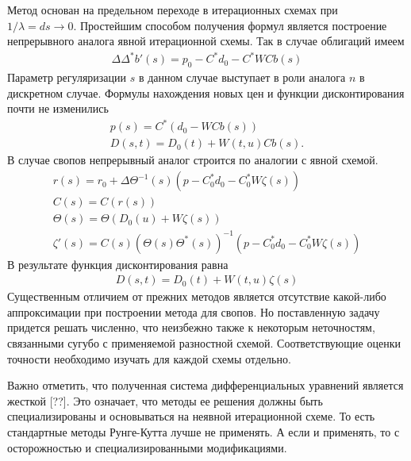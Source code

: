 \documentclass[10pt]{article}
\theoremstyle{definition}
\theoremstyle{remark}
\theoremstyle{plain}
\begin{document}
\begin{itemize}
Метод основан на предельном переходе в итерационных схемах при $1/\lambda = ds\rightarrow 0$. Простейшим способом получения формул является построение непрерывного аналога явной итерационной схемы.  Так в случае облигаций имеем
\begin{align*}
\Delta\Delta^*b'(s) = p_0-C^*d_0 - C^*WCb(s)
\end{align*}
Параметр регуляризации $s$ в данном случае выступает в роли аналога $n$ в дискретном случае. Формулы нахождения новых цен и функции дисконтирования почти не изменились 
\begin{gather*}
p(s) = C^*(d_0 - WCb(s))\\
D(s,t) = D_0(t) + W(t,u)C b(s).
\end{gather*}
В случае свопов непрерывный аналог строится по аналогии с явной схемой.
\begin{gather*}
r(s) = r_0 + \Delta\Theta^{-1}(s)\left(p - C_0^*d_0 - C_0^*W\zeta(s)\right) 
\\
C(s) = C(r(s))
\\
\Theta(s) = \Theta(D_0(u) + W\zeta(s))
\\
\zeta'(s) = C(s)(\Theta(s)\Theta^*(s))^{-1}
\left(p - C_0^*d_0 - C_0^*W\zeta(s)\right) 
\end{gather*}
В результате функция дисконтирования равна
\begin{align*}
D(s,t) = D_0(t) + W(t,u)\zeta(s)
\end{align*}
Существенным отличием от прежних методов является отсутствие какой-либо аппроксимации при построении метода для свопов. Но поставленную задачу придется решать численно, что неизбежно также к некоторым неточностям, связанными сугубо с применяемой разностной схемой. Соответствующие оценки точности необходимо изучать для каждой схемы отдельно.

Важно отметить, что полученная система дифференциальных уравнений является жесткой [??]. Это означает, что методы ее решения должны быть специализированы и основываться на неявной итерационной схеме. То есть стандартные методы Рунге-Кутта лучше не применять. А если и применять, то с осторожностью и специализированными модификациями. 

\end{itemize}
\end{document}
